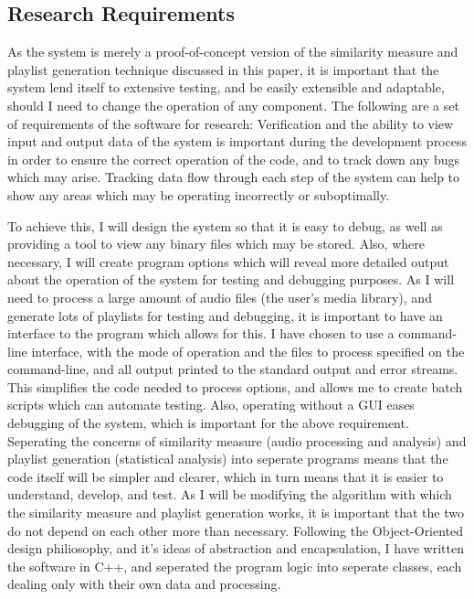 \subsection{Research Requirements}
As the system is merely a proof-of-concept version of the similarity measure and playlist generation technique discussed in this paper, it is important that the system lend itself to extensive testing, and be easily extensible and adaptable, should I need to change the operation of any component. The following are a set of requirements of the software for research: 
Verification and the ability to view input and output data of the system is important during the development process in order to ensure the correct operation of the code, and to track down any bugs which may arise. Tracking data flow through each step of the system can help to show any areas which may be operating incorrectly or suboptimally.

To achieve this, I will design the system so that it is easy to debug, as well as providing a tool to view any binary files which may be stored. Also, where necessary, I will create program options which will reveal more detailed output about the operation of the system for testing and debugging purposes.
As I will need to process a large amount of audio files (the user's media library), and generate lots of playlists for testing and debugging, it is important to have an interface to the program which allows for this. I have chosen to use a command-line interface, with the mode of operation and the files to process specified on the command-line, and all output printed to the standard output and error streams. This simplifies the code needed to process options, and allows me to create batch scripts which can automate testing. Also, operating without a GUI eases debugging of the system, which is important for the above requirement.
Seperating the concerns of similarity measure (audio processing and analysis) and playlist generation (statistical analysis) into seperate programs means that the code itself will be simpler and clearer, which in turn means that it is easier to understand, develop, and test. As I will be modifying the algorithm with which the similarity measure and playlist generation works, it is important that the two do not depend on each other more than necessary. Following the Object-Oriented design philiosophy, and it's ideas of abstraction and encapsulation, I have written the software in C++, and seperated the program logic into seperate classes, each dealing only with their own data and processing.
